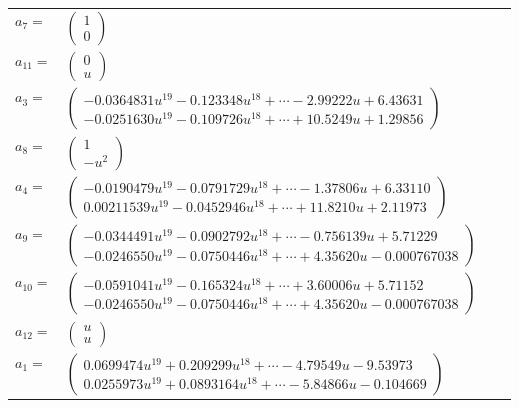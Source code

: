 \documentclass[1p]{elsarticle_modified}
\theoremstyle{definition}
\begin{document}
\begin{tabular}{m{7pt} m{180pt} m{7pt} m{180pt} }
\flushright $a_{7}=$&$\begin{pmatrix}1\\0\end{pmatrix}$ \\
\flushright $a_{11}=$&$\begin{pmatrix}0\\u\end{pmatrix}$ \\
\flushright $a_{3}=$&$\begin{pmatrix}-0.0364831 u^{19}-0.123348 u^{18}+\cdots-2.99222 u+6.43631\\-0.0251630 u^{19}-0.109726 u^{18}+\cdots+10.5249 u+1.29856\end{pmatrix}$ \\
\flushright $a_{8}=$&$\begin{pmatrix}1\\- u^2\end{pmatrix}$ \\
\flushright $a_{4}=$&$\begin{pmatrix}-0.0190479 u^{19}-0.0791729 u^{18}+\cdots-1.37806 u+6.33110\\0.00211539 u^{19}-0.0452946 u^{18}+\cdots+11.8210 u+2.11973\end{pmatrix}$ \\
\flushright $a_{9}=$&$\begin{pmatrix}-0.0344491 u^{19}-0.0902792 u^{18}+\cdots-0.756139 u+5.71229\\-0.0246550 u^{19}-0.0750446 u^{18}+\cdots+4.35620 u-0.000767038\end{pmatrix}$ \\
\flushright $a_{10}=$&$\begin{pmatrix}-0.0591041 u^{19}-0.165324 u^{18}+\cdots+3.60006 u+5.71152\\-0.0246550 u^{19}-0.0750446 u^{18}+\cdots+4.35620 u-0.000767038\end{pmatrix}$ \\
\flushright $a_{12}=$&$\begin{pmatrix}u\\u\end{pmatrix}$ \\
\flushright $a_{1}=$&$\begin{pmatrix}0.0699474 u^{19}+0.209299 u^{18}+\cdots-4.79549 u-9.53973\\0.0255973 u^{19}+0.0893164 u^{18}+\cdots-5.84866 u-0.104669\end{pmatrix}$ \\

\end{tabular}
\end{document}

